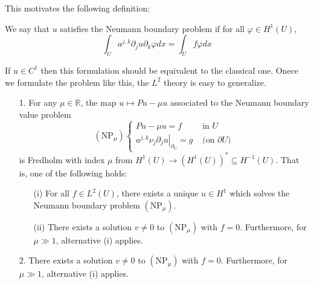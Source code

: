 This motivates the following definition:

\begin{definition}
\label{def: Neumann boundary problem}
 We say that $u$ satisfies the Neumann boundary problem if for all $\varphi \in H^{1}(U)$,
$$
\int_{U} a^{j, k} \partial_{j} u \partial_{k} \varphi d x=\int_{U} f \varphi d x
$$
\end{definition}

\begin{remark}
If $u\in C^1$ then this formulation should be equivalent to the classical one. Onece we formulate the problem like this, the $L^2$ theory is easy to generalize. 
\end{remark}


\begin{theorem}
\begin{itemize}
    \item []
    \item [1.] 
    For any $\mu \in \mathbb{R}$, the map $u \mapsto P u-\mu u$ associated to the Neumann boundary value problem
    $$
    \left(\mathrm{NP}_{\mu}\right) \begin{cases}P u-\mu u=f & \text { in } U \\ \left.a^{j, k} \nu_{j} \partial_{j} u\right|_{\partial_{U}}=g & \text { (on } \partial U)\end{cases}
    $$
    is Fredholm with index $\mu$ from $H^{1}(U) \rightarrow\left(H^{1}(U)\right)^{*} \subseteq H^{-1}(U)$. That is, one of the following holds:
    \begin{itemize}
        \item [(i)] 
        For all $f \in L^{2}(U)$, there exists a unique $u \in H^{1}$ which solves the Neumann boundary problem $\left(\mathrm{NP}_{\mu}\right)$.
        \item [(ii)] 
        There exists a solution $v \neq 0$ to $\left(\mathrm{NP}_{\mu}\right)$ with $f=0$. Furthermore, for $\mu \gg 1$, alternative (i) applies.
    \end{itemize}
    \item [2.] 
    There exists a solution $v \neq 0$ to $\left(\mathrm{NP}_{\mu}\right)$ with $f=0$. Furthermore, for $\mu \gg 1$, alternative (i) applies.
\end{itemize}

\end{theorem}


